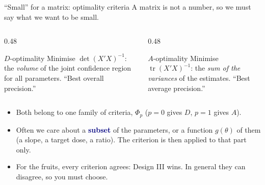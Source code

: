 \documentclass[aspectratio=169,10pt]{beamer}
\newcommand{\key}[1]{\textcolor{navy}{\textbf{#1}}}
\newcommand{\tr}{\operatorname{tr}}
\begin{document}
\begin{frame}{``Small'' for a matrix: optimality criteria}
  A matrix is not a number, so we must say what we want to be small.
  \begin{columns}[T]
    \begin{column}{0.48\textwidth}
      \begin{block}{$D$-optimality}
        Minimise $\det (X'X)^{-1}$: the \emph{volume} of the joint confidence region for all parameters.
        ``Best overall precision.''
      \end{block}
    \end{column}
    \begin{column}{0.48\textwidth}
      \begin{block}{$A$-optimality}
        Minimise $\tr (X'X)^{-1}$: the \emph{sum of the variances} of the estimates.
        ``Best average precision.''
      \end{block}
    \end{column}
  \end{columns}
  \vspace{0.6em}
  \begin{itemize}
    \item Both belong to one family of criteria, $\Phi_p$ ($p=0$ gives $D$, $p=1$ gives $A$).
    \item Often we care about a \key{subset} of the parameters, or a function $g(\theta)$ of them
          (a slope, a target dose, a ratio). The criterion is then applied to that part only.
    \item For the fruits, every criterion agrees: Design III wins. In general they can disagree, so you must choose.
  \end{itemize}
\end{frame}
\end{document}

